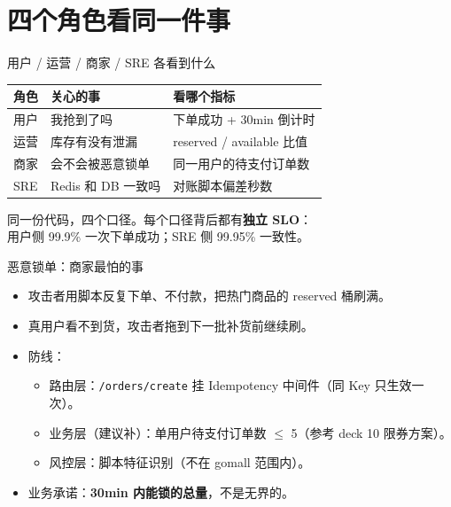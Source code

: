 \section{四个角色看同一件事}

\begin{frame}{用户 / 运营 / 商家 / SRE 各看到什么}
\begin{tabular}{@{}llp{5.5cm}@{}}
\toprule
角色 & 关心的事 & 看哪个指标 \\
\midrule
用户   & 我抢到了吗               & 下单成功 + 30min 倒计时 \\
运营   & 库存有没有泄漏           & reserved / available 比值 \\
商家   & 会不会被恶意锁单         & 同一用户的待支付订单数 \\
SRE   & Redis 和 DB 一致吗      & 对账脚本偏差秒数 \\
\bottomrule
\end{tabular}
\vspace{3mm}
\small 同一份代码，四个口径。每个口径背后都有\textbf{独立 SLO}：\\
用户侧 99.9\% 一次下单成功；SRE 侧 99.95\% 一致性。
\end{frame}

\begin{frame}{恶意锁单：商家最怕的事}
\begin{itemize}
  \item 攻击者用脚本反复下单、不付款，把热门商品的 reserved 桶刷满。
  \item 真用户看不到货，攻击者拖到下一批补货前继续刷。
  \item 防线：
  \begin{itemize}
    \item 路由层：\texttt{/orders/create} 挂 Idempotency 中间件（同 Key 只生效一次）。
    \item 业务层（建议补）：单用户待支付订单数 $\le$ 5（参考 deck 10 限券方案）。
    \item 风控层：脚本特征识别（不在 gomall 范围内）。
  \end{itemize}
  \item 业务承诺：\textbf{30min 内能锁的总量}，不是无界的。
\end{itemize}
\end{frame}

